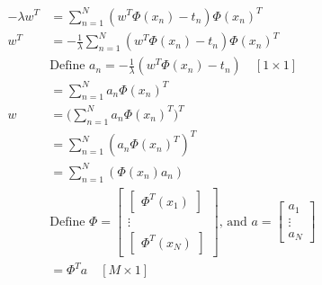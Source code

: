 \documentclass[../main.tex]{subfiles}
\begin{document}
\begin{align*}
    -\lambda w^T & = \sum_{n=1}^N (w^T\Phi(x_n) - t_n) \Phi(x_n)^T                                                                                                                                      \\
    w^T          & = -\frac{1}{\lambda} \sum_{n=1}^N (w^T\Phi(x_n) - t_n) \Phi(x_n)^T                                                                                                                   \\
                 & \text{Define } a_n = -\frac{1}{\lambda} (w^T\Phi(x_n) - t_n) \quad [1 \times 1]                                                                                                             \\
                 & = \sum_{n=1}^N a_n \Phi(x_n)^T                                                                                                                                                       \\
    w            & = \bigg( \sum_{n=1}^N a_n \Phi(x_n)^T \bigg)^T                                                                                                                                       \\
                 & = \sum_{n=1}^N (a_n \Phi(x_n)^T)^T                                                                                                                                                   \\
                 & = \sum_{n=1}^N (\Phi(x_n) a_n)                                                                                                                                                       \\
                 & \text{Define } \Phi = \begin{bmatrix}\begin{bmatrix}\Phi^T(x_1)\end{bmatrix}\\ \vdots \\ \begin{bmatrix} \Phi^T(x_N)\end{bmatrix}\end{bmatrix} \text{, and } a=\begin{bmatrix}a_1 \\ \vdots \\ a_N\end{bmatrix} \\
                 & = \Phi^T a \quad [M \times 1]
\end{align*}
\end{document}
